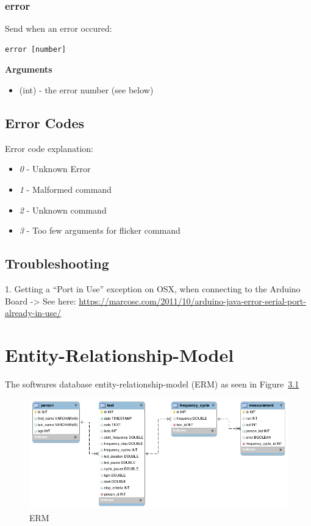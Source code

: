 \subsection{error}
\label{appendix/led-protocol:protocol-output-error}\label{appendix/led-protocol:error}
Send when an error occured:

\begin{verbatim}
error [number]
\end{verbatim}

\textbf{Arguments}
\begin{itemize}
\item {} 
 (int) - the error number (see below)

\end{itemize}


\section{Error Codes}
\label{appendix/led-protocol:error-codes}
Error code explanation:
\begin{itemize}
\item {} 
\emph{0} - Unknown Error

\item {} 
\emph{1} - Malformed command

\item {} 
\emph{2} - Unknown command

\item {} 
\emph{3} - Too few arguments for flicker command

\end{itemize}


\section{Troubleshooting}
\label{appendix/led-protocol:troubleshooting}
1. Getting a ``Port in Use'' exception on OSX, when connecting to the Arduino Board
-\textgreater{} See here: \href{https://marcosc.com/2011/10/arduino-java-error-serial-port-already-in-use/}{https://marcosc.com/2011/10/arduino-java-error-serial-port-already-in-use/}


\chapter{Entity-Relationship-Model}
\label{appendix/erm:erm}\label{appendix/erm::doc}
The softwares database entity-relationship-model (ERM) as seen in Figure~\ref{fig:appendix-erm}

\begin{figure}[H]
	\includegraphics[width=\textwidth]{images/erm.png}
	\caption{ERM}
	\label{fig:appendix-erm}
\end{figure}

